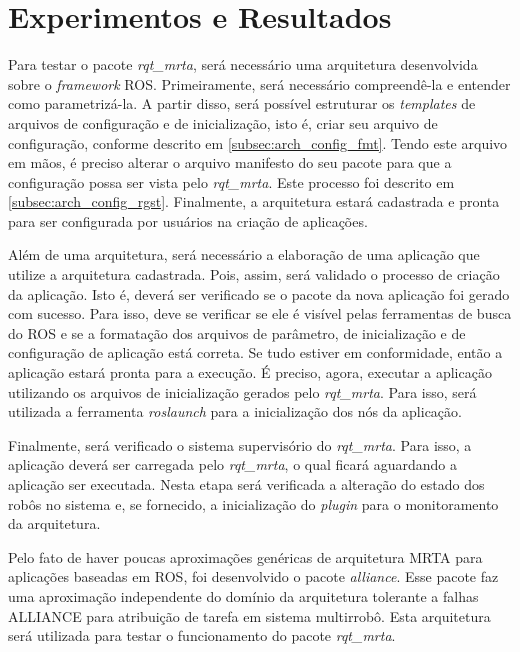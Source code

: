 \chapter[Experimentos e Resultados]{Experimentos e Resultados} \label{cap:resultados}
    Para testar o pacote \textit{rqt\_mrta}, será necessário uma arquitetura desenvolvida sobre o \textit{framework} ROS. Primeiramente, será necessário compreendê-la e entender como parametrizá-la. A partir disso, será possível estruturar os \textit{templates} de arquivos de configuração e de inicialização, isto é, criar seu arquivo de configuração, conforme descrito em \ref{subsec:arch_config_fmt}. Tendo este arquivo em mãos, é preciso alterar o arquivo manifesto do seu pacote para que a configuração possa ser vista pelo \textit{rqt\_mrta}. Este processo foi descrito em \ref{subsec:arch_config_rgst}. Finalmente, a arquitetura estará cadastrada e pronta para ser configurada por usuários na criação de aplicações.
    
    Além de uma arquitetura, será necessário a elaboração de uma aplicação que utilize a arquitetura cadastrada. Pois, assim, será validado o processo de criação da aplicação. Isto é, deverá ser verificado se o pacote da nova aplicação foi gerado com sucesso. Para isso, deve se verificar se ele é visível pelas ferramentas de busca do ROS e se a formatação dos arquivos de parâmetro, de inicialização e de configuração de aplicação está correta. Se tudo estiver em conformidade, então a aplicação estará pronta para a execução. É preciso, agora, executar a aplicação utilizando os arquivos de inicialização gerados pelo \textit{rqt\_mrta}. Para isso, será utilizada a ferramenta \textit{roslaunch} para a inicialização dos nós da aplicação. 
    
    Finalmente, será verificado o sistema supervisório do \textit{rqt\_mrta}. Para isso, a aplicação deverá ser carregada pelo \textit{rqt\_mrta}, o qual ficará aguardando a aplicação ser executada. Nesta etapa será verificada a alteração do estado dos robôs no sistema e, se fornecido, a inicialização do \textit{plugin} para o monitoramento da arquitetura.
    
    Pelo fato de haver poucas aproximações genéricas de arquitetura MRTA para aplicações baseadas em ROS, foi desenvolvido o pacote \textit{alliance}. Esse pacote faz uma aproximação independente do domínio da arquitetura tolerante a falhas ALLIANCE \cite{ref:parker1998alliance} para atribuição de tarefa em sistema multirrobô. Esta arquitetura será utilizada para testar o funcionamento do pacote \textit{rqt\_mrta}. 
    
